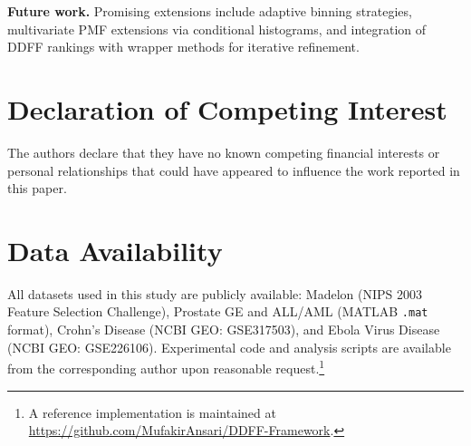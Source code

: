 \documentclass[conference]{IEEEtran}
\begin{document}
\textbf{Future work.} Promising extensions include adaptive binning strategies, multivariate PMF extensions via conditional histograms, and integration of DDFF rankings with wrapper methods for iterative refinement.

\section*{Declaration of Competing Interest}
The authors declare that they have no known competing financial interests or personal relationships that could have appeared to influence the work reported in this paper.

\section*{Data Availability}
All datasets used in this study are publicly available: Madelon (NIPS 2003 Feature Selection Challenge), Prostate GE and ALL/AML (MATLAB \texttt{.mat} format), Crohn's Disease (NCBI GEO: GSE317503), and Ebola Virus Disease (NCBI GEO: GSE226106). Experimental code and analysis scripts are available from the corresponding author upon reasonable request.\footnote{A reference implementation is maintained at \url{https://github.com/MufakirAnsari/DDFF-Framework}.}



\end{document}
